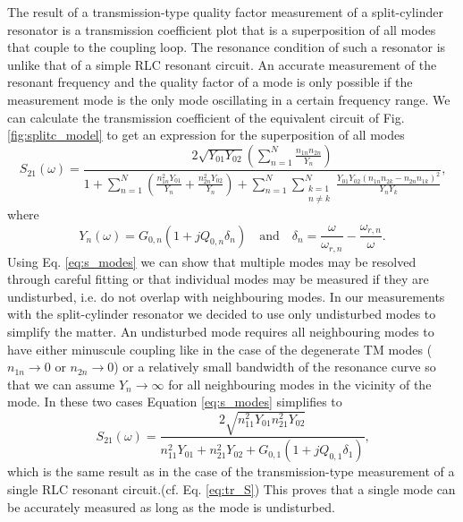 The result of a transmission-type quality factor measurement of a split-cylinder resonator is a transmission coefficient plot that is a superposition of all modes that couple to the coupling loop. The resonance condition of such a resonator is unlike that of a simple RLC resonant circuit. An accurate measurement of the resonant frequency and the quality factor of a mode is only possible if the measurement mode is the only mode oscillating in a certain frequency range. We can calculate the transmission coefficient of the equivalent circuit of Fig. \ref{fig:splitc_model} to get an expression for the superposition of all modes
\begin{equation}\label{eq:s_modes}
S_{21}(\omega)=\frac{2\sqrt{Y_{01}Y_{02}}\left(\sum\limits_{n=1}^{N}\frac{n_{1n}n_{2n}}{Y_n}\right)}{1+\sum\limits_{n=1}^{N}\left(\frac{n_{1n}^2Y_{01}}{Y_n}+\frac{n_{2n}^2Y_{02}}{Y_n}\right)+\sum\limits_{n=1}^{N}\sum\limits_{\substack{k=1 \\ n\neq k}}^{N}\frac{Y_{01}Y_{02}\left(n_{1n}n_{2k}-n_{2n}n_{1k} \right)^2}{Y_nY_k}} \text{,}
\end{equation}
where
\begin{equation}
Y_n(\omega)=G_{0,n}(1+jQ_{0,n}\delta_n) \quad \text{and} \quad \delta_n = \frac{\omega}{\omega_{r,n}}-\frac{\omega_{r,n}}{\omega}\text{.}
\end{equation}
Using Eq. \eqref{eq:s_modes} we can show that multiple modes may be resolved through careful fitting or that individual modes may be measured if they are undisturbed, i.e. do not overlap with neighbouring modes. In our measurements with the split-cylinder resonator we decided to use only undisturbed modes to simplify the matter. An undisturbed mode requires all neighbouring modes to have either minuscule coupling like in the case of the degenerate TM modes ($n_{1n}\rightarrow 0$ or $n_{2n}\rightarrow 0$) or a relatively small bandwidth of the resonance curve so that we can assume $Y_n\rightarrow\infty$ for all neighbouring modes in the vicinity of the mode. In these two cases Equation \eqref{eq:s_modes} simplifies to
\begin{equation}
S_{21}(\omega)=\frac{2\sqrt{n_{11}^2Y_{01}n_{21}^2Y_{02}}}{n_{11}^2Y_{01}+n_{21}^2Y_{02}+G_{0,1}(1+jQ_{0,1}\delta_1)}\text{,}
\end{equation}
which is the same result as in the case of the transmission-type measurement of a single RLC resonant circuit.(cf. Eq. \eqref{eq:tr_S}) This proves that a single mode can be accurately measured as long as the mode is undisturbed.

